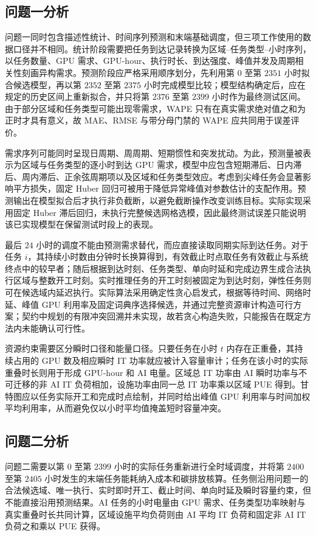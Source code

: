 \documentclass[withoutpreface,bwprint]{cumcmthesis}
\begin{document}
\subsection{问题一分析}

问题一同时包含描述性统计、时间序列预测和末端基础调度，但三项工作使用的数据口径并不相同。统计阶段需要把任务到达记录转换为区域--任务类型--小时序列，以任务数量、GPU 需求、GPU-hour、执行时长、到达强度、峰值并发及周期相关性刻画异构需求。预测阶段应严格采用顺序划分，先利用第 $0$ 至第 $2351$ 小时拟合候选模型，再以第 $2352$ 至第 $2375$ 小时完成模型比较；模型结构确定后，应在规定的历史区间上重新拟合，并只将第 $2376$ 至第 $2399$ 小时作为最终测试区间。由于部分区域和任务类型可能出现零需求，WAPE 只有在真实需求绝对值之和为正时才具有意义，故 MAE、RMSE 与带分母门禁的 WAPE 应共同用于误差评价。

需求序列可能同时呈现日周期、周周期、短期惯性和突发扰动。为此，预测量被表示为区域与任务类型的逐小时到达 GPU 需求，模型中应包含短期滞后、日内滞后、周内滞后、正余弦周期项以及区域和任务类型效应。考虑到尖峰任务会显著影响平方损失，固定 Huber 回归可被用于降低异常峰值对参数估计的支配作用。预测输出在模型拟合后才执行非负截断，以避免截断操作改变训练目标。实际实现采用固定 Huber 滞后回归，未执行完整候选网格选模，因此最终测试误差只能说明该已实现模型在保留测试时段上的表现。

最后 $24$ 小时的调度不能由预测需求替代，而应直接读取同期实际到达任务。对于任务 $i$，其持续小时数由分钟时长换算得到，有效截止时点取任务有效截止与系统终点中的较早者；随后根据到达时刻、任务类型、单向时延和完成边界生成合法执行区域与整数开工时刻。实时推理任务的开工时刻被固定为到达时刻，弹性任务则可在候选域内延迟执行。实际算法采用确定性贪心启发式，根据等待时间、网络时延、峰值 GPU 利用率及固定词典序选择候选，并通过完整资源审计构造可行方案；契约中规划的有限冲突回溯并未实现，故若贪心构造失败，只能报告在既定方法内未能确认可行性。

资源约束需要区分瞬时口径和能量口径。只要任务在小时 $t$ 内存在正重叠，其持续占用的 GPU 数及相应瞬时 IT 功率就应被计入容量审计；任务在该小时的实际重叠时长则用于形成 GPU-hour 和 AI 电量。区域总 IT 功率由 AI 瞬时功率与不可迁移的非 AI IT 负荷相加，设施功率由同一总 IT 功率乘以区域 PUE 得到。甘特图应以任务实际开工和完成时点绘制，并同时给出峰值 GPU 利用率与时间加权平均利用率，从而避免仅以小时平均值掩盖短时容量冲突。

\subsection{问题二分析}

问题二需要以第 $0$ 至第 $2399$ 小时的实际任务重新进行全时域调度，并将第 $2400$ 至第 $2405$ 小时发生的末端任务能耗纳入成本和碳排放核算。任务侧沿用问题一的合法候选域、唯一执行、实时即时开工、截止时间、单向时延及瞬时容量约束，但不能直接沿用预测结果。AI 任务的小时电量由 GPU 需求、任务类型功率映射与真实重叠时长共同计算，区域设施平均负荷则由 AI 平均 IT 负荷和固定非 AI IT 负荷之和乘以 PUE 获得。
\end{document}

